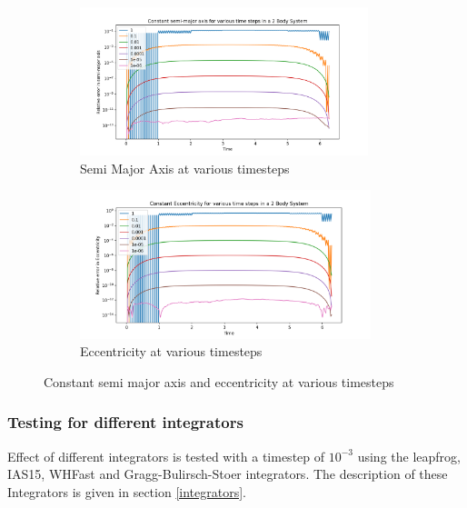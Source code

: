 \documentclass[12pt,a4paper]{article}
\begin{document}
\begin{figure}[H]
  \centering
  \begin{subfigure}{0.49\textwidth}
    \includegraphics[height = 1.7in]{2Body/2Body_const_a_dt.png}
    \caption{Semi Major Axis at various timesteps}
    \label{fig:dt_a}  
  \end{subfigure}
  \begin{subfigure}{0.49\textwidth}
    \includegraphics[height = 1.7in]{2Body/2Body_const_ecc_dt.png}
    \caption{Eccentricity at various timesteps}
    \label{fig:dt_ecc}  
  \end{subfigure}
  \caption{Constant semi major axis and eccentricity at various timesteps}
\end{figure}
\subsubsection{Testing for different integrators}
Effect of different integrators is tested with a timestep of $10^{-3}$ using the leapfrog, IAS15, WHFast and Gragg-Bulirsch-Stoer integrators. 
The description of these Integrators is given in section \ref{integrators}.\\
\end{document}
